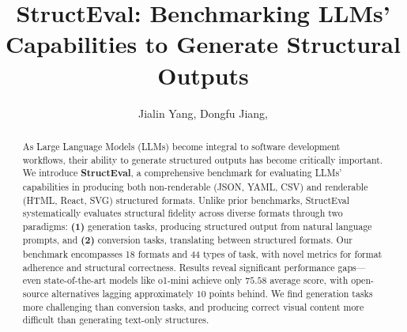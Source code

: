 \documentclass[11pt]{article}
\title{StructEval: Benchmarking LLMs' Capabilities to Generate Structural Outputs}
\author{Jialin Yang, Dongfu Jiang, }
\begin{document}
\maketitle




\begin{abstract}
As Large Language Models (LLMs) become integral to software development workflows, their ability to generate structured outputs has become critically important. We introduce \textbf{StructEval}, a comprehensive benchmark for evaluating LLMs' capabilities in producing both non-renderable (JSON, YAML, CSV) and renderable (HTML, React, SVG) structured formats. Unlike prior benchmarks, StructEval systematically evaluates structural fidelity across diverse formats through two paradigms: \textbf{(1)} generation tasks, producing structured output from natural language prompts, and \textbf{(2)} conversion tasks, translating between structured formats. Our benchmark encompasses 18 formats and 44 types of task, with novel metrics for format adherence and structural correctness. Results reveal significant performance gaps—even state-of-the-art models like o1-mini achieve only $75.58$ average score, with open-source alternatives lagging approximately $10$ points behind. We find generation tasks more challenging than conversion tasks, and producing correct visual content more difficult than generating text-only structures.
\end{abstract}














\appendix

\end{document}
